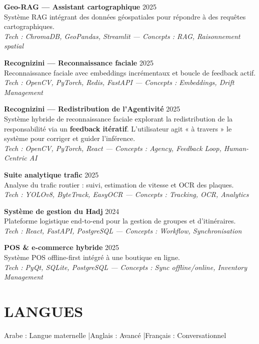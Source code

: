 \documentclass[a4paper,12pt]{article}
\begin{document}
{\textbf{Geo-RAG — Assistant cartographique} \hfill 2025 \\
Système RAG intégrant des données géospatiales pour répondre à des requêtes cartographiques. \\
\textit{Tech : ChromaDB, GeoPandas, Streamlit — Concepts : RAG, Raisonnement spatial}

\textbf{Recognizini — Reconnaissance faciale} \hfill 2025 \\
Reconnaissance faciale avec embeddings incrémentaux et boucle de feedback actif. \\
\textit{Tech : OpenCV, PyTorch, Redis, FastAPI — Concepts : Embeddings, Drift Management}

\textbf{Recognizini — Redistribution de l'Agentivité} \hfill 2025 \\
Système hybride de reconnaissance faciale explorant la redistribution de la responsabilité via un \textbf{feedback itératif}. L'utilisateur agit « à travers » le système pour corriger et guider l'inférence. \\
\textit{Tech : OpenCV, PyTorch, React — Concepts : Agency, Feedback Loop, Human-Centric AI}

\textbf{Suite analytique trafic} \hfill 2025 \\
Analyse du trafic routier : suivi, estimation de vitesse et OCR des plaques. \\
\textit{Tech : YOLOv8, ByteTrack, EasyOCR — Concepts : Tracking, OCR, Analytics}

\textbf{Système de gestion du Hadj} \hfill 2024 \\
Plateforme logistique end-to-end pour la gestion de groupes et d’itinéraires. \\
\textit{Tech : React, FastAPI, PostgreSQL — Concepts : Workflow, Synchronisation}

\textbf{POS \& e-commerce hybride} \hfill 2025 \\
Système POS offline-first intégré à une boutique en ligne. \\
\textit{Tech : PyQt, SQLite, PostgreSQL — Concepts : Sync offline/online, Inventory Management}
}

\section{LANGUES}
Arabe : Langue maternelle \quad|\quad Anglais : Avancé \quad|\quad Français : Conversationnel
\end{document}
